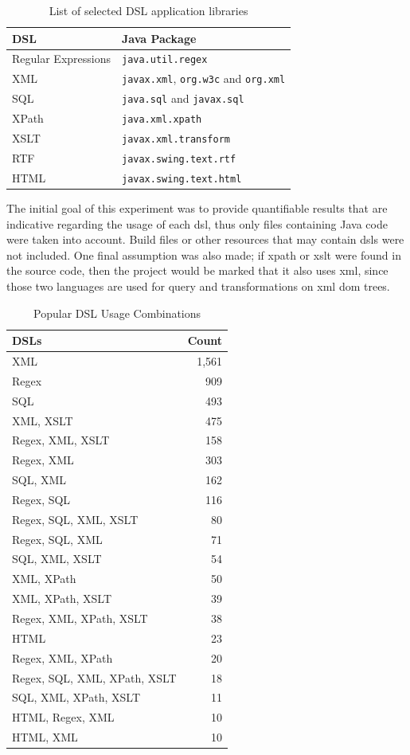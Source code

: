 \documentclass{sig-alternate}
\begin{document}
\begin{table}
\centering
\caption{List of selected DSL application libraries}
\label{tbl:dsl-list}
\begin{tabular}{l l}
 \hline
\textbf{DSL} & \textbf{Java Package}\\
\hline
Regular Expressions & \verb|java.util.regex|\\
XML & \verb|javax.xml|, \verb|org.w3c| and \verb|org.xml|\\
SQL & \verb|java.sql| and \verb|javax.sql|\\
XPath & \verb|java.xml.xpath|\\
XSLT & \verb|javax.xml.transform|\\
RTF & \verb|javax.swing.text.rtf|\\
HTML & \verb|javax.swing.text.html|\\
\hline
\end{tabular}
\end{table}

The initial goal of this experiment was to provide quantifiable results that are indicative regarding the usage of each {\sc dsl}, thus only files containing Java code were taken into account. Build files or other resources that may contain {\sc dsl}s were not included. One final assumption was also made; if {\sc xpath} or {\sc xslt} were found in the source code, then the project would be marked that it also uses {\sc xml}, since those two languages are used for query and transformations on {\sc xml} {\sc dom} trees.

\begin{table}
\centering
\caption{Popular DSL Usage Combinations}
\label{tbl:dsl-top-usage}
\begin{tabular}{l r}
 \hline
\textbf{DSLs} & \textbf{Count}\\
\hline
XML & 1,561\\
Regex & 909\\
SQL & 493\\
XML, XSLT & 475\\
Regex, XML, XSLT & 158\\
Regex, XML & 303\\
SQL, XML & 162\\
Regex, SQL & 116\\
Regex, SQL, XML, XSLT & 80\\
Regex, SQL, XML & 71\\
SQL, XML, XSLT & 54\\
XML, XPath & 50\\
XML, XPath, XSLT & 39\\
Regex, XML, XPath, XSLT & 38\\
HTML & 23\\
Regex, XML, XPath & 20\\
Regex, SQL, XML, XPath, XSLT & 18\\
SQL, XML, XPath, XSLT & 11\\
HTML, Regex, XML & 10\\
HTML, XML & 10\\
\hline
\end{tabular}
\end{table}
\end{document}
